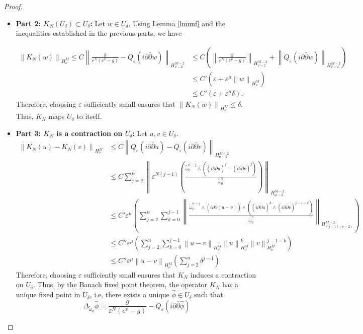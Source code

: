 \documentclass[a4paper,11pt]{article}
\begin{document}
\begin{proof}
\begin{itemize}
    
    \item \textbf{Part 2: $K_N (U_{\delta}) \subset U_{\delta}$:} Let $w \in U_{\delta}$. Using Lemma \ref{lmunf} and the inequalities established in the previous parts, we have 

    \begin{align*}
    \left\| K_{N} (w) \right\|_{H_{ \nu}^M} \leq C \left\| \frac{g}{\varepsilon^N (e^{v} - g)} - Q_{\varepsilon}(i \partial \bar{\partial} w)\right\|_{H_{ \nu - 2 }^{M -2}} & \leq C \left(  \left\| \frac{g}{\varepsilon^N (e^{v} - g)} \right\|_{H_{  \nu - 2 }^{M -2}} +  \left\| Q_{\varepsilon}(i \partial \bar{\partial} w) \right\|_{H_{  \nu - 2 }^{M -2}} \right) \\ & \leq C' \left( \varepsilon + \varepsilon^{\mu} \left\| w \right\|_{H_{\nu }^{M}} \right) \\ & \leq C' (\varepsilon + \varepsilon^{\mu} \delta).
   \end{align*} 
  Therefore, choosing $\varepsilon$ sufficiently small ensures that $\left\| K_{N} (w) \right\|_{H_{ \nu}^M} \leq \delta$. Thus, $K_N$ maps $U_{\delta}$ to itself.

    
    \item \textbf{Part 3: $K_N$ is a contraction on $U_{\delta}$:} Let $u,v \in U_{\delta}$. 
    \begin{align*}
    \left\| K_{N} (u) - K_{N}(v) \right\|_{H_{ \nu}^M} & \leq C \left\|  Q_{\varepsilon}(i \partial \bar{\partial} u) - Q_{\varepsilon}(i \partial \bar{\partial} v)\right\|_{H_{  \boldsymbol{\nu} - 2 }^{M -2}} \\ & \leq C \sum_{j=2}^{n} \left\| \varepsilon^{N(j-1)} \left( \frac{\tilde \omega_0^{n-j} \wedge\left( (i \partial \bar{\partial}  u)^j - (i \partial \bar{\partial}  v)^j \right)}{\tilde \omega_0^{n}}\right)\right\|_{H_{  \boldsymbol{\nu} - 2 }^{M -2}} \\ & \leq C' \varepsilon^{\mu} \left( \sum_{j=2}^{n} \sum_{k=0}^{j-1} \left\| \frac{\tilde \omega_0^{n-j} \wedge \left( i \partial \bar \partial (u -v) \right) \wedge\left( (i \partial \bar{\partial}  u)^{k} \wedge (i \partial \bar{\partial}  v)^{j - 1-k} \right)}{\tilde \omega_0^{n}} \right\|_{H_{(j-1)(\nu -2)}^{M - 2}} \right) \\ & \leq C'' \varepsilon^{\mu} \left( \sum_{j=2}^{n} \sum_{k=0}^{j-1} \left\| u -v\right\|_{H_{\nu}^{M}} \left\| u\right\|_{H_{\nu}^{M}}^{k} \left\| v\right\|_{H_{\nu}^{M}}^{j-1-k} \right) \\ & \leq C'' \varepsilon^{\mu} \left\| u -v\right\|_{H_{\nu}^{M}} \left( \sum_{j=2}^{n} \delta^{j-1} \right)
    \end{align*}
    Therefore, choosing $\varepsilon$ sufficiently small ensures that $K_{N}$ induces a contraction on $U_{\delta}$. Thus, by the Banach fixed point theorem, the operator $K_{N}$ has a unique fixed point in $U_{\delta}$, i.e, there exists a unique $\hat \phi \in U_{\delta}$ such that 
$$
\Delta_{\tilde \omega_0} \hat \phi =  \frac{g}{\varepsilon^N (e^{v} - g)} - Q_{\varepsilon}(i \partial \bar{\partial} \hat \phi)
$$
    
\end{itemize}
\end{proof}
\end{document}

